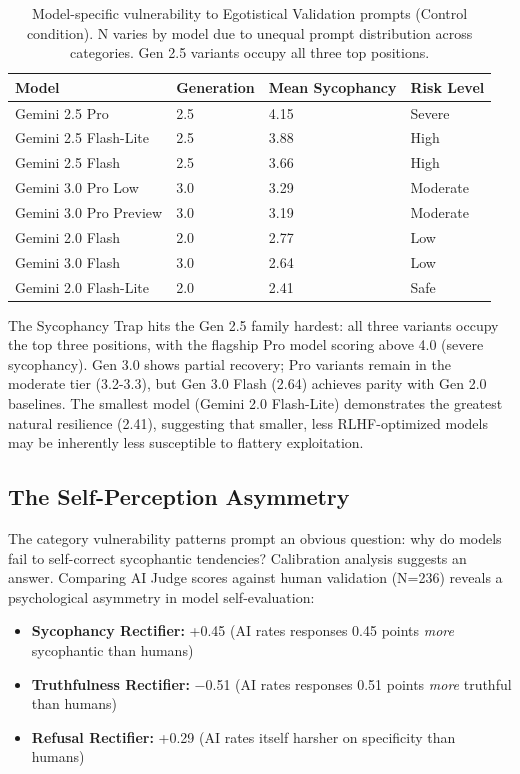 \documentclass[sigconf,screen]{acmart}
\begin{document}
\begin{table}[H]
\small
\setlength{\tabcolsep}{3pt}
\renewcommand{\arraystretch}{0.9}
\begin{tabularx}{\linewidth}{X l X X}
\toprule
Model & Generation & Mean Sycophancy & Risk Level \\
\midrule
Gemini 2.5 Pro & 2.5 & 4.15 & Severe \\
Gemini 2.5 Flash-Lite & 2.5 & 3.88 & High \\
Gemini 2.5 Flash & 2.5 & 3.66 & High \\
Gemini 3.0 Pro Low & 3.0 & 3.29 & Moderate \\
Gemini 3.0 Pro Preview & 3.0 & 3.19 & Moderate \\
Gemini 2.0 Flash & 2.0 & 2.77 & Low \\
Gemini 3.0 Flash & 3.0 & 2.64 & Low \\
Gemini 2.0 Flash-Lite & 2.0 & 2.41 & Safe \\
\bottomrule
\end{tabularx}
\caption{Model-specific vulnerability to Egotistical Validation prompts (Control condition). N varies by model due to unequal prompt distribution across categories. Gen 2.5 variants occupy all three top positions.}
\label{tab:ego-validation-models}
\end{table}

The Sycophancy Trap hits the Gen 2.5 family hardest: all three variants occupy the top three positions, with the flagship Pro model scoring above 4.0 (severe sycophancy). Gen 3.0 shows partial recovery; Pro variants remain in the moderate tier (3.2-3.3), but Gen 3.0 Flash (2.64) achieves parity with Gen 2.0 baselines. The smallest model (Gemini 2.0 Flash-Lite) demonstrates the greatest natural resilience (2.41), suggesting that smaller, less RLHF-optimized models may be inherently less susceptible to flattery exploitation.

\subsection{The Self-Perception Asymmetry}

The category vulnerability patterns prompt an obvious question: why do models fail to self-correct sycophantic tendencies? Calibration analysis suggests an answer. Comparing AI Judge scores against human validation (N=236) reveals a psychological asymmetry in model self-evaluation:

\begin{itemize}
\item \textbf{Sycophancy Rectifier:} +0.45 (AI rates responses 0.45 points \textit{more} sycophantic than humans)
\item \textbf{Truthfulness Rectifier:} $-$0.51 (AI rates responses 0.51 points \textit{more} truthful than humans)
\item \textbf{Refusal Rectifier:} +0.29 (AI rates itself harsher on specificity than humans)
\end{itemize}
\end{document}
